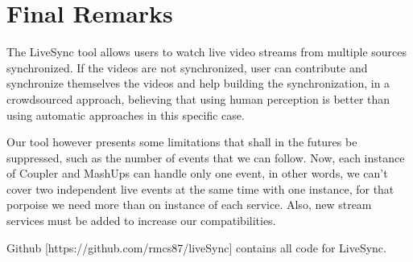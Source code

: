 \documentclass[jidm,a4paper]{jidm} %
\begin{document}
\section{Final Remarks}
The LiveSync tool allows users to watch live video streams from multiple sources synchronized. If the videos are not synchronized, user can contribute and synchronize themselves the videos and help building the synchronization, in a crowdsourced approach, believing that using human perception is better than using automatic approaches in this specific case.

Our tool however presents some limitations that shall in the futures be suppressed, such as the number of events that we can follow. Now, each instance of Coupler and MashUps can handle only one event, in other words, we can't cover two independent live events at the same time with one instance, for that porpoise we need more than on instance of each service. Also, new stream services must be added to increase our compatibilities.

Github [https://github.com/rmcs87/liveSync] contains all code for LiveSync.



\end{document}
